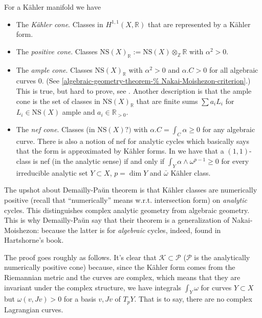 For a Kähler manifold we have
\begin{itemize}
\item The {\it Kähler cone}. Classes
in $H^{1,1}(X,\mathbb{R})$ that are
represented by a
Kähler form.

\item The {\it positive cone}. Classes
$\text{NS}(X)_\mathbb{R}
:=\text{NS}(X) \otimes_\mathbb{Z}\mathbb{R}$
with $\alpha^2>0$.

\item The {\it ample cone}. Classes
$\text{NS}(X)_\mathbb{R}$
with $\alpha^2>0$ and $\alpha.C>0$ for all
algebraic curves 0.
(See
\ref{algebraic-geometry-theorem-%
Nakai-Moishezon-criterion}.)
This is true, but hard to prove, see
\cite[p. 150]{huk}.
Another description is that the ample cone
is the set of classes in
$\text{NS}(X)_\mathbb{R}$
that are finite sums $\sum a_iL_i$
for $L_i \in \text{NS}(X)$ ample
and $a_i \in \mathbb{R}_{>0}$.

\item The {\it nef cone}. Classes (in
$\text{NS}(X)?)$
with $\alpha.C=\int_C\alpha\geq 0$ for any
algebraic curve.
There is also a notion of nef for analytic
cycles
which basically says that the form is
approximated
by Kähler forms.
In \cite[Theorem 4.7(ii)]{Demailly-Paun} we
have that
a $(1,1)$-class is nef (in the analytic
sense) if and only if
$\int_Y \alpha\wedge\omega^{p-1}\geq 0$ for
every
irreducible analytic set $Y \subset X$,
$p=\dim Y$
and $\bar{\omega}$ Kähler class.

\end{itemize}

\noindent
The upshot about Demailly-Pa\u un theorem
is that Kähler classes are numerically
positive
(recall that ``numerically'' means w.r.t.
intersection form)
on {\it analytic} cycles. This distinguishes
complex analytic geometry from algebraic
geometry.
This is why Demailly-Pa\u un say that
their theorem is a generalization of
Nakai-Moishezon:
because the latter is for {\it algebraic}
cycles,
indeed, found in Hartshorne's book.

The proof goes roughly as follows.
It's clear that $\mathcal{K} \subset
\mathcal{P}$
($\mathcal{P}$ is the analytically
numerically positive cone)
because, since the Kähler form
comes from the Riemannian metric
and the curves are complex,
which means that they are invariant under
the complex structure,
we have integrals
$\int_Y\omega$ for curves $Y \subset X$
but $\omega(v,Jv)>0$ for a basis $v,Jv$
of $T_pY$.
That is to say, there are no complex
Lagrangian curves.

